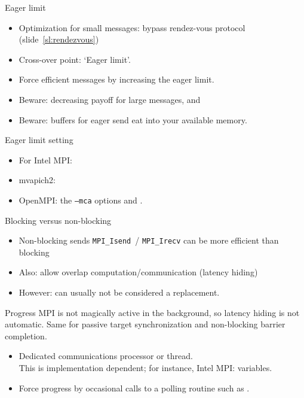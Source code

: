 
\begin{numberedframe}{Eager limit}
  \begin{itemize}
  \item Optimization for small messages: bypass rendez-vous protocol
    (slide~\ref{sl:rendezvous})
  \item Cross-over point: `Eager limit'.
  \item Force efficient messages by increasing the eager limit.
  \item Beware: decreasing payoff for large messages, and
  \item Beware: buffers for eager send eat into your available memory.
  \end{itemize}
\end{numberedframe}

\begin{numberedframe}{Eager limit setting}
    \begin{itemize}
    \item For Intel MPI: 
    \item mvapich2: 
    \item OpenMPI:  the
      \texttt{--mca} options  and
      .
    \end{itemize}
\end{numberedframe}

\begin{numberedframe}{Blocking versus non-blocking}
  \begin{itemize}
  \item Non-blocking sends \lstinline{MPI_Isend}~/ \lstinline{MPI_Irecv} can be more
    efficient than blocking
  \item Also: allow overlap computation/communication (latency hiding)
  \item However: can usually not be considered a replacement.
  \end{itemize}
\end{numberedframe}

\begin{numberedframe}{Progress}
  MPI is not magically active in the background, so latency hiding is
  not automatic. Same for passive target synchronization and
  non-blocking barrier completion.
  \begin{itemize}
  \item Dedicated communications processor or thread.\\
    This is implementation dependent; for instance,
    Intel MPI:  variables.
  \item Force progress by occasional calls to a polling
    routine such as .
  \end{itemize}
\end{numberedframe}

